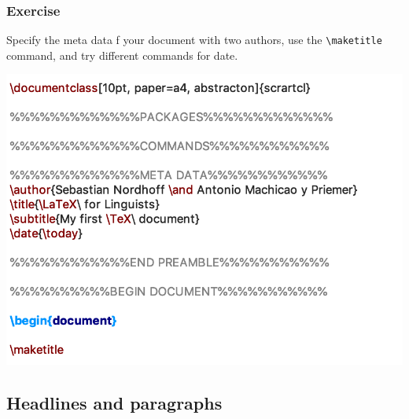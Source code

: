 \begin{frame}[fragile]
\frametitle{Exercise}

Specify the meta data f your document with two authors, use the  \lstinline|\maketitle| command, and try different commands for date.

\centering
\includegraphics[width=0.65\linewidth]{../../texfiles-beamer/tex-material/WissArb-latex/xelatexTest3tex}

\end{frame}


\subsection{Headlines and paragraphs}


